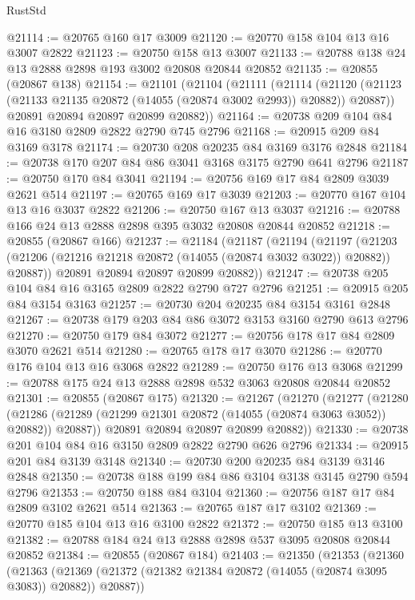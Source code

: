\begin{lexlean}{RustStd}
\begin{coremodule}
@21114 := @20765 @160 @17 @3009
@21120 := @20770 @158 @104 @13 @16 @3007 @2822
@21123 := @20750 @158 @13 @3007
@21133 := @20788 @138 @24 @13 @2888 @2898 @193 @3002 @20808 @20844 @20852
@21135 := @20855 (@20867 @138)
@21154 := @21101
    (@21104
      (@21111
        (@21114
          (@21120 (@21123 (@21133 @21135 @20872 (@14055 (@20874 @3002 @2993)) @20882)) @20887))
        @20891
        @20894
        @20897
        @20899
        @20882))
@21164 := @20738 @209 @104 @84 @16 @3180 @2809 @2822 @2790 @745 @2796
@21168 := @20915 @209 @84 @3169 @3178
@21174 := @20730 @208 @20235 @84 @3169 @3176 @2848
@21184 := @20738 @170 @207 @84 @86 @3041 @3168 @3175 @2790 @641 @2796
@21187 := @20750 @170 @84 @3041
@21194 := @20756 @169 @17 @84 @2809 @3039 @2621 @514
@21197 := @20765 @169 @17 @3039
@21203 := @20770 @167 @104 @13 @16 @3037 @2822
@21206 := @20750 @167 @13 @3037
@21216 := @20788 @166 @24 @13 @2888 @2898 @395 @3032 @20808 @20844 @20852
@21218 := @20855 (@20867 @166)
@21237 := @21184
    (@21187
      (@21194
        (@21197
          (@21203 (@21206 (@21216 @21218 @20872 (@14055 (@20874 @3032 @3022)) @20882)) @20887))
        @20891
        @20894
        @20897
        @20899
        @20882))
@21247 := @20738 @205 @104 @84 @16 @3165 @2809 @2822 @2790 @727 @2796
@21251 := @20915 @205 @84 @3154 @3163
@21257 := @20730 @204 @20235 @84 @3154 @3161 @2848
@21267 := @20738 @179 @203 @84 @86 @3072 @3153 @3160 @2790 @613 @2796
@21270 := @20750 @179 @84 @3072
@21277 := @20756 @178 @17 @84 @2809 @3070 @2621 @514
@21280 := @20765 @178 @17 @3070
@21286 := @20770 @176 @104 @13 @16 @3068 @2822
@21289 := @20750 @176 @13 @3068
@21299 := @20788 @175 @24 @13 @2888 @2898 @532 @3063 @20808 @20844 @20852
@21301 := @20855 (@20867 @175)
@21320 := @21267
    (@21270
      (@21277
        (@21280
          (@21286 (@21289 (@21299 @21301 @20872 (@14055 (@20874 @3063 @3052)) @20882)) @20887))
        @20891
        @20894
        @20897
        @20899
        @20882))
@21330 := @20738 @201 @104 @84 @16 @3150 @2809 @2822 @2790 @626 @2796
@21334 := @20915 @201 @84 @3139 @3148
@21340 := @20730 @200 @20235 @84 @3139 @3146 @2848
@21350 := @20738 @188 @199 @84 @86 @3104 @3138 @3145 @2790 @594 @2796
@21353 := @20750 @188 @84 @3104
@21360 := @20756 @187 @17 @84 @2809 @3102 @2621 @514
@21363 := @20765 @187 @17 @3102
@21369 := @20770 @185 @104 @13 @16 @3100 @2822
@21372 := @20750 @185 @13 @3100
@21382 := @20788 @184 @24 @13 @2888 @2898 @537 @3095 @20808 @20844 @20852
@21384 := @20855 (@20867 @184)
@21403 := @21350
    (@21353
      (@21360
        (@21363
          (@21369 (@21372 (@21382 @21384 @20872 (@14055 (@20874 @3095 @3083)) @20882)) @20887))

\end{coremodule}
\end{lexlean}
